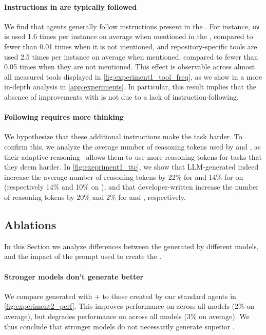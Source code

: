\paragraph{Instructions in \agentsmds{} are typically followed}
We find that agents generally follow instructions present in the \agentsmds{}.
For instance, \texttt{uv} is used 1.6 times per instance on average when mentioned in the \agentsmds{}, compared to fewer than 0.01 times when it is not mentioned, and repository-specific tools are used 2.5 times per instance on average when mentioned, compared to fewer than 0.05 times when they are not mentioned.
This effect is observable across almost all measured tools displayed in \cref{fig:experiment1_tool_freq}, as we show in a more in-depth analysis in \cref{app:experiments}.
In particular, this result implies that the absence of improvements with \agentsmds{} is not due to a lack of instruction-following.



\paragraph{Following \agentsmds{} requires more thinking}
We hypothesize that these additional instructions make the task harder.
To confirm this, we analyze the average number of reasoning tokens used by \gptfive{} and \gptfivemini{}, as their adaptive reasoning~\citep{adaptive_reasoning} allows them to use more reasoning tokens for tasks that they deem harder.
In \cref{fig:exepriment1_ttc}, we show that LLM-generated \agentsmds{} indeed increase the average number of reasoning tokens by 22\% for \gptfive{} and 14\% for \gptfivemini{} on \swebench{} (respectively 14\% and 10\% on \planbench{}), and that developer-written \agentsmds{} increase the number of reasoning tokens by 20\% and 2\% for \gptfive{} and \gptfivemini{}, respectively.


\subsection{Ablations}

In this Section we analyze differences between the \agentsmds{} generated by different models, and the impact of the prompt used to create the \agentsmds{}.



\paragraph{Stronger models don't generate better \agentsmds{}}
We compare \agentsmds{} generated with \gptfive{} + \codex{} to those created by our standard agents in \cref{fig:experiment2_perf}.
This improves performance on \swebench{} across all models (2\% on average), but degrades performance on \planbench{} across all models (3\% on average).
We thus conclude that stronger models do not necessarily generate superior \agentsmds{}.


